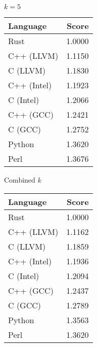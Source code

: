 \begin{subtable}{0.33\textwidth}
    \centering
    \caption{$k=5$}
    \label{table:energy:dfa_gap(5)}
    \begin{tabular}{|l|r|}
        \hline
        Language & Score \\
        \hline
        Rust & 1.0000 \\
        C++ (LLVM) & 1.1150 \\
        C (LLVM) & 1.1830 \\
        C++ (Intel) & 1.1923 \\
        C (Intel) & 1.2066 \\
        C++ (GCC) & 1.2421 \\
        C (GCC) & 1.2752 \\
        Python & 1.3620 \\
        Perl & 1.3676 \\
        \hline
    \end{tabular}
\end{subtable}%
\begin{subtable}{0.33\textwidth}
    \centering
    \caption{Combined $k$}
    \label{table:energy:dfa_gap:combined}
    \begin{tabular}{|l|r|}
        \hline
        Language & Score \\
        \hline
        Rust & 1.0000 \\
        C++ (LLVM) & 1.1162 \\
        C (LLVM) & 1.1859 \\
        C++ (Intel) & 1.1936 \\
        C (Intel) & 1.2094 \\
        C++ (GCC) & 1.2437 \\
        C (GCC) & 1.2789 \\
        Python & 1.3563 \\
        Perl & 1.3620 \\
        \hline
    \end{tabular}
\end{subtable}